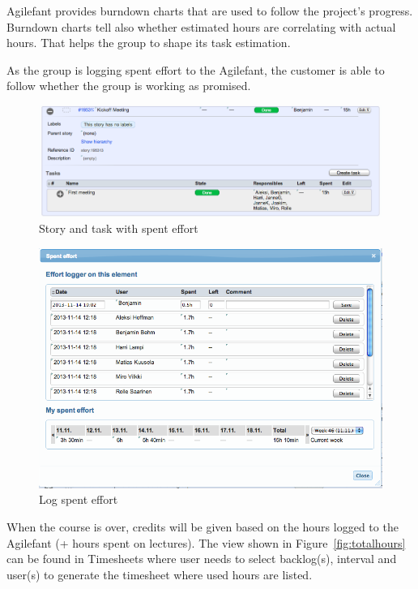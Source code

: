 Agilefant provides burndown charts that are used to follow the project's progress. Burndown charts tell also whether estimated hours are correlating with actual hours. That helps the group to shape its task estimation.

As the group is logging spent effort to the Agilefant, the customer is able to follow whether the group is working as promised. 

\begin{figure}[H]
\centering
\includegraphics[width=1\textwidth]{imgs/spenteffort1.png}
\caption{Story and task with spent effort}
\label{fig:spenteffort1}
\end{figure}


\begin{figure}[H]
\centering
\includegraphics[width=1\textwidth]{imgs/spenteffort2.png}
\caption{Log spent effort}
\label{fig:spenteffort2}
\end{figure}

When the course is over, credits will be given based on the hours logged to the 
Agilefant (+ hours spent on lectures). The view shown in 
Figure~\ref{fig:totalhours} can be found in Timesheets where user needs to 
select backlog(s), interval and user(s) to generate the timesheet where used 
hours are listed.

